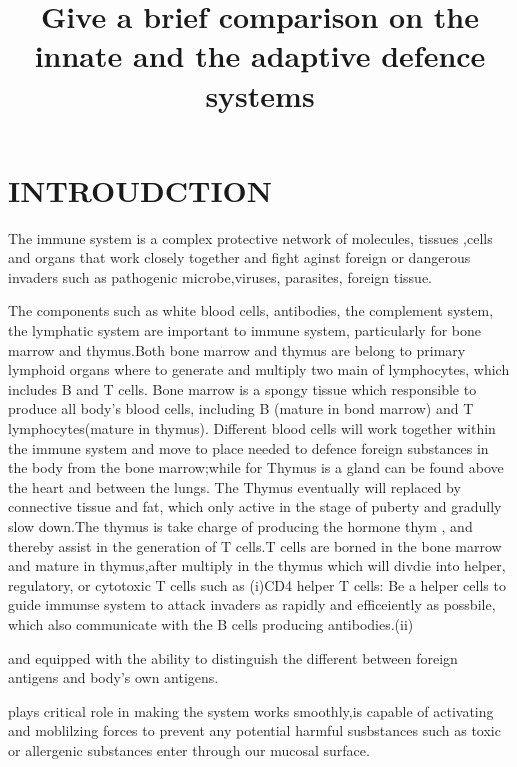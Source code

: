 \documentclass[12pt]{article}
\begin{document}
  
\title{\large Give a brief comparison on the innate and the adaptive defence systems \vspace{-2em}}
\date{\vspace{-2.5em}}
\maketitle

\section{INTROUDCTION}
The immune system is a complex protective network of molecules, tissues ,cells and organs that work closely together and fight aginst foreign or dangerous invaders such as pathogenic microbe,viruses, parasites, foreign tissue.\medskip

The components such as white blood cells, antibodies, the complement system, the lymphatic system are important to  immune system, particularly for bone marrow and thymus.Both bone marrow and thymus are belong to primary lymphoid organs where to  generate and multiply two main of lymphocytes, which includes B and T cells.
Bone marrow is a spongy tissue which responsible to produce all body's blood cells, including B (mature in bond marrow) and T lymphocytes(mature in thymus). Different blood cells will work together within the immune system and  move to place needed to defence foreign substances in the body from the bone marrow;while for Thymus is a gland can be found above the heart and between the lungs. The Thymus eventually will replaced by connective tissue and fat, which only active in the stage of puberty and gradully slow down.The thymus is take charge of producing the hormone thym , and thereby assist in the generation of T cells.T cells are borned in the bone marrow and mature in thymus,after multiply in the thymus which will divdie into helper, regulatory, or cytotoxic T cells such as (i)CD4 helper T cells: Be a helper cells to guide immunse system to attack invaders as rapidly and efficeiently as possbile, which also communicate with the B cells producing antibodies.(ii) 


and equipped with the ability to distinguish the different between foreign antigens and body's own antigens.


plays critical role in making the system works smoothly,is capable of activating and moblilzing forces to prevent any  potential harmful susbstances such as toxic or allergenic substances enter through our mucosal surface.\medskip
\end{document}
